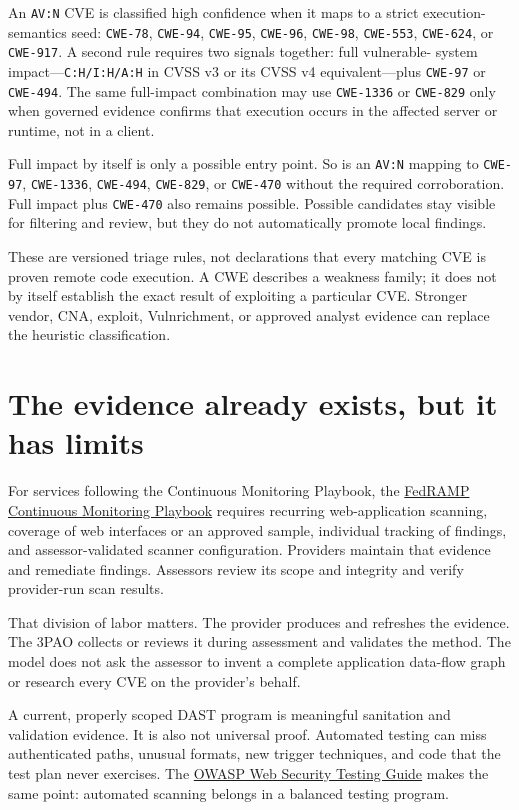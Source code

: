 \documentclass[11pt]{article}
\newcommand{\code}[1]{\texttt{#1}}
\begin{document}
An \code{AV:N} CVE is classified high confidence when it maps to a strict
execution-semantics seed: \code{CWE-78}, \code{CWE-94}, \code{CWE-95},
\code{CWE-96}, \code{CWE-98}, \code{CWE-553}, \code{CWE-624}, or
\code{CWE-917}. A second rule requires two signals together: full vulnerable-
system impact---\code{C:H/I:H/A:H} in CVSS v3 or its CVSS v4 equivalent---plus
\code{CWE-97} or \code{CWE-494}. The same full-impact combination may use
\code{CWE-1336} or \code{CWE-829} only when governed evidence confirms that
execution occurs in the affected server or runtime, not in a client.

Full impact by itself is only a possible entry point. So is an \code{AV:N}
mapping to \code{CWE-97}, \code{CWE-1336}, \code{CWE-494}, \code{CWE-829}, or
\code{CWE-470} without the required corroboration. Full impact plus
\code{CWE-470} also remains possible. Possible candidates stay visible for
filtering and review, but they do not automatically promote local findings.

These are versioned triage rules, not declarations that every matching CVE is
proven remote code execution. A CWE describes a weakness family; it does not by
itself establish the exact result of exploiting a particular CVE. Stronger
vendor, CNA, exploit, Vulnrichment, or approved analyst evidence can replace
the heuristic classification.

\section*{The evidence already exists, but it has limits}
For services following the Continuous Monitoring Playbook, the
\href{https://www.fedramp.gov/resources/documents/Continuous_Monitoring_Playbook.pdf}{FedRAMP
Continuous Monitoring Playbook} requires recurring web-application scanning,
coverage of web interfaces or an approved sample, individual tracking of
findings, and assessor-validated scanner configuration. Providers maintain that
evidence and remediate findings. Assessors review its scope and integrity and
verify provider-run scan results.

That division of labor matters. The provider produces and refreshes the
evidence. The 3PAO collects or reviews it during assessment and validates the
method. The model does not ask the assessor to invent a complete application
data-flow graph or research every CVE on the provider's behalf.

A current, properly scoped DAST program is meaningful sanitation and validation
evidence. It is also not universal proof. Automated testing can miss authenticated
paths, unusual formats, new trigger techniques, and code that the test plan never
exercises. The
\href{https://owasp.org/www-project-web-security-testing-guide/v42/2-Introduction/README}{OWASP
Web Security Testing Guide} makes the same point: automated scanning belongs in a
balanced testing program.
\end{document}
